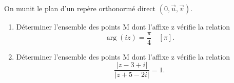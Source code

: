 On munit le plan d'un repère orthonormé direct $(0,\overrightarrow{u},\overrightarrow{v})$.
\begin{enumerate}
\item Déterminer l'ensemble des points M dont l'affixe z vérifie la relation
\[ \arg(iz) = \frac{\pi}{4} \quad [\pi].\]
\item Déterminer l'ensemble des points M dont l'affixe z vérifie la relation
\[ \frac{|z-3+i|}{|z+5-2i|} = 1.\]
\end{enumerate}